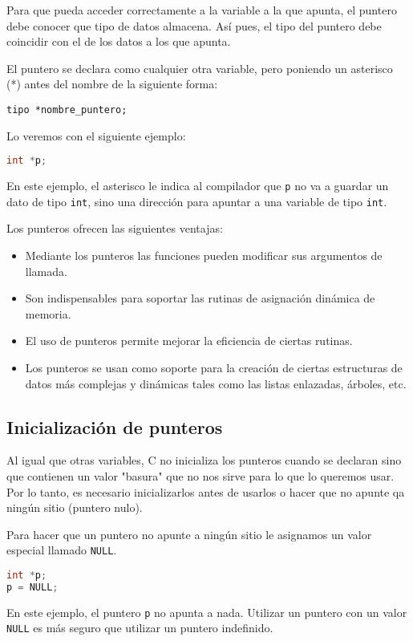 Para que pueda acceder correctamente a la variable a la que apunta, el puntero debe conocer que tipo de datos almacena. Así pues, el tipo del puntero debe coincidir con el de los datos a los que apunta.

El puntero se declara como cualquier otra variable, pero poniendo un asterisco (*) antes del nombre de la siguiente forma:

\texttt{tipo *nombre\_puntero;}

Lo veremos con el siguiente ejemplo:
\begin{Ejemplo}
\begin{lstlisting}[language=C]
int *p;
\end{lstlisting}
\Explicacion
En este ejemplo, el asterisco le indica al compilador que \texttt{p} no va a guardar un dato de tipo \texttt{int}, sino una dirección para apuntar a una variable de tipo \texttt{int}.\\
\end{Ejemplo}
Los punteros ofrecen las siguientes ventajas:
\begin{itemize}
	\item Mediante los punteros las funciones pueden modificar sus argumentos de llamada.
	\item Son indispensables para soportar las rutinas de asignación dinámica de memoria.
	\item El uso de punteros permite mejorar la eficiencia de ciertas rutinas.
	\item Los punteros se usan como soporte para la creación de ciertas estructuras de datos más complejas y dinámicas tales como las listas enlazadas, árboles, etc.
\end{itemize}
\subsection{Inicialización de punteros}{
Al igual que otras variables, C no inicializa los punteros cuando se declaran sino que contienen un valor "basura" que no nos sirve para lo que lo queremos usar. Por lo tanto, es necesario inicializarlos antes de usarlos o hacer que no apunte qa ningún sitio (puntero nulo).

Para hacer que un puntero no apunte a ningún sitio le asignamos un valor especial llamado \texttt{NULL}.
\begin{Ejemplo}
\begin{lstlisting}[language=C]
int *p;
p = NULL;
\end{lstlisting}
\Explicacion
En este ejemplo, el puntero \texttt{p} no apunta a nada. Utilizar un puntero con un valor \texttt{NULL} es más seguro que utilizar un puntero indefinido.
\end{Ejemplo}
}
